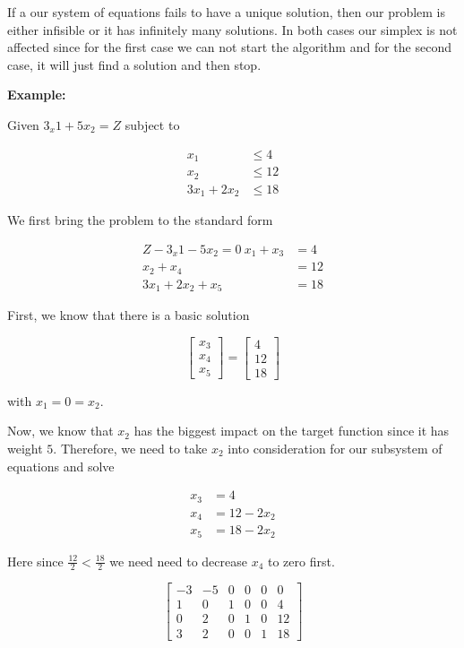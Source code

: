 If a our system of equations fails to have a unique solution, then our problem is either infisible or it has infinitely
many solutions. In both cases our simplex is not affected since for the first case we can not start the algorithm and for the second case,
it will just find a solution and then stop.


\textbf{Example:}

Given \(3_x1 + 5 x_2 = Z\) subject to

\begin{align*}
	x_1         & \le 4  \\
	x_2         & \le 12 \\
	3x_1 + 2x_2 & \le 18
\end{align*}

We first bring the problem to the standard form

\begin{align*}
	Z - 3_x1 - 5 x_2 = 0\
	x_1  + x_3         & = 4  \\
	x_2  + x_4         & = 12 \\
	3x_1 + 2x_2  + x_5 & = 18
\end{align*}


First, we know that there is a basic solution

\[
	\begin{bmatrix}
		x_3 \\
		x_4 \\
		x_5
	\end{bmatrix}
	=
	\begin{bmatrix}
		4  \\
		12 \\
		18
	\end{bmatrix}
\]

with \(x_1 = 0 = x_2\).

Now, we know that \(x_2\) has the biggest impact on the target function since it has weight \(5\). Therefore, we need
to take \(x_2\) into consideration for our subsystem of equations and solve

\begin{align*}
	x_3 & = 4         \\
	x_4 & = 12 - 2x_2 \\
	x_5 & = 18 - 2x_2
\end{align*}

Here since \(\frac{12}{2} < \frac{18}{2}\) we need need to decrease \(x_4\) to zero first.

\[
	\left[
		\begin{array}{ccccc|c}
			-3 & -5 & 0 & 0 & 0 & 0  \\
			1  & 0  & 1 & 0 & 0 & 4  \\
			0  & 2  & 0 & 1 & 0 & 12 \\
			3  & 2  & 0 & 0 & 1 & 18
		\end{array}
		\right]
\]

